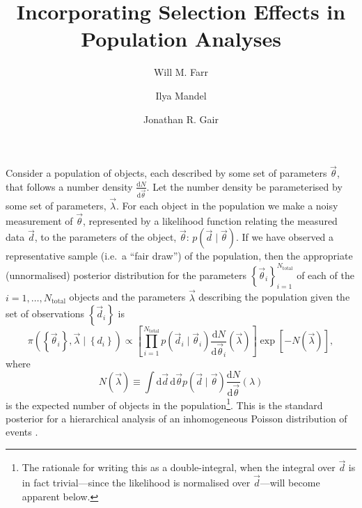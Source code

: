 \documentclass[modern]{aastex62}
\newcommand{\dd}{\mathrm{d}}
\newcommand{\diff}[2]{\frac{\dd #1}{\dd #2}}
\newcommand{\Ntotal}{N_\mathrm{total}}
\newcommand{\vd}{\vec{d}}
\newcommand{\vlambda}{\vec{\lambda}}
\newcommand{\vtheta}{\vec{\theta}}
\begin{document}
\title{Incorporating Selection Effects in Population Analyses}

\author[0000-0003-1540-8562]{Will M. Farr}

\author[0000-0002-6134-8946]{Ilya Mandel}

\author{Jonathan R. Gair}

\section*{}

Consider a population of objects, each described by some set of parameters
$\vtheta$, that follows a number density $\diff{N}{\vtheta}$.  Let the number
density be parameterised by some set of parameters, $\vlambda$.  For each object
in the population we make a noisy measurement of $\vtheta$, represented by a
likelihood function relating the measured data $\vd$, to the parameters of the
object, $\vtheta$: $p\left( \vd \mid \vtheta \right)$.  If we have observed a
representative sample (i.e.\ a ``fair draw'') of the population, then the
appropriate (unnormalised) posterior distribution for the parameters $\left\{
\vtheta_i \right\}_{i=1}^{\Ntotal}$ of each of the $i = 1, \ldots, \Ntotal$
objects and the parameters $\vlambda$ describing the population given the set of
observations $\left\{ \vd_i \right\}$ is
%
\begin{equation}
  \pi\left(\left\{ \vtheta_i \right\}, \vlambda \mid \left\{ d_i \right\}\right) \propto \left[ \prod_{i=1}^{\Ntotal} p\left( \vd_i \mid \vtheta_i \right) \diff{N}{\vtheta_i}\left( \vlambda \right) \right] \exp\left[ - N\left( \vlambda \right) \right],
\end{equation}
%
where
%
\begin{equation}
N\left( \vlambda \right) \equiv \int \dd \vd \, \dd \vtheta p\left( \vd \mid \vtheta \right) \diff{N}{\vtheta}\left( \lambda \right)
\end{equation}
%
is the expected number of objects in the population\footnote{The rationale for
writing this as a double-integral, when the integral over $\vd$ is in fact
trivial---since the likelihood is normalised over $\vd$---will become apparent
below.}.  This is the standard posterior for a hierarchical analysis of an
inhomogeneous Poisson distribution of events
\citep{Loredo1995,Hogg2010,Mandel2010,Youdin2011,Foreman-Mackey2014,Farr2015}.
\end{document}
